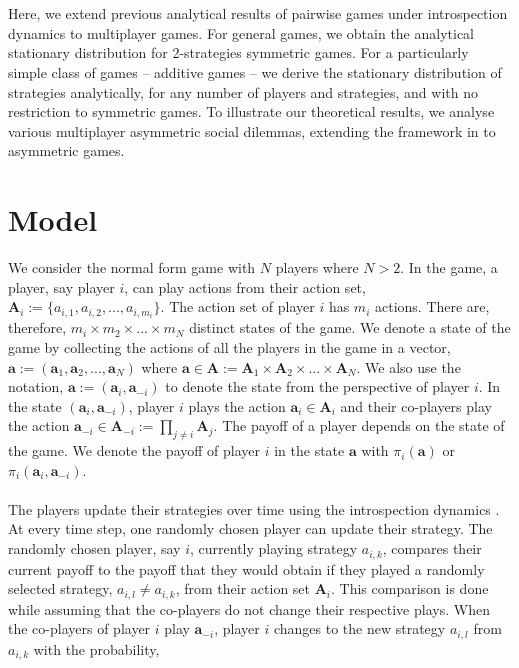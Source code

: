 \documentclass[11pt]{article}
\theoremstyle{plainCl1}
\theoremstyle{plainCl2}
\newcommand{\A}{\mathbf{A}}
\newcommand{\abf}{\mathbf{a}}
\begin{document}
\\ \\
\noindent Here, we extend previous analytical results of pairwise games under introspection dynamics to multiplayer games. 
For general games, we obtain the analytical stationary distribution for 2-strategies symmetric games.
For a particularly simple class of games -- additive games -- we derive the stationary distribution of strategies analytically, for any number of players and strategies, and with no restriction to symmetric games. 
To illustrate our theoretical results, we analyse various multiplayer asymmetric social dilemmas, extending the framework in \cite{Hauert:JTB:2006a} to asymmetric games. 


\section*{Model}
We consider the normal form game with $N$ players where $N > 2$. In the game, a player, say player $i$, can play actions from their action set, $\A_i := \{a_{i,1}, a_{i,2}, ..., a_{i,m_i} \}$. The action set of player $i$ has $m_i$ actions. There are, therefore, $m_i \times m_2 \times ... \times m_N$ distinct states of the game. We denote a state of the game by collecting the actions of all the players in the game in a vector, $\abf := (\abf_1, \abf_2, ..., \abf_N)$ where $\abf \in \A := \A_1 \times \A_2 \times ... \times \A_N$. We also use the notation, $\abf := (\abf_i, \abf_{-i})$ to denote the state from the perspective of player $i$. In the state $(\abf_i, \abf_{-i})$, player $i$ plays the action $\abf_i \in \A_i$ and their co-players play the action $\abf_{-i} \in \A_{-i} := \prod_{j \neq i} \A_j$. The payoff of a player depends on the state of the game. We denote the payoff of player $i$ in the state $\abf$ with $\pi_i(\abf)$ or $\pi_i(\abf_i, \abf_{-i})$. \\ \\ 
\noindent The players update their strategies over time using the introspection dynamics \cite{couto2022introspection}. At every time step, one randomly chosen player can update their strategy. The randomly chosen player, say $i$, currently playing strategy $a_{i,k}$, compares their current payoff to the payoff that they would obtain if they played a randomly selected strategy,  $a_{i,l} \neq a_{i,k}$, from their action set $\A_i$. This comparison is done while assuming that the co-players do not change their respective plays. When the co-players of player $i$ play $\abf_{-i}$, player $i$ changes to the new strategy $a_{i,l}$ from $a_{i,k}$ with the probability, \\
\end{document}
